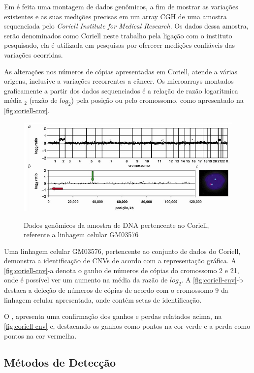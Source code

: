 Em \cite{Snijders2001} é feita uma montagem de dados genômicos, a fim de mostrar as variações existentes e as suas medições precisas em um array CGH de uma amostra sequenciada pelo \textit{Coriell Institute for Medical Research}. Os dados dessa amostra, serão denominados como Coriell neste trabalho pela ligação com o instituto pesquisado, ela é utilizada em pesquisas por oferecer medições confiáveis das variações ocorridas. 

As alterações nos números de cópias apresentadas em Coriell, atende a várias origens, inclusive a variações recorrentes a câncer. Os microarrays montados graficamente a partir dos dados sequenciados é a relação de razão logarítmica média $_2$ (razão de $log_{2}$) pela posição ou pelo cromossomo, como apresentado na \autoref{fig:coriell-cnv}.

\begin{figure}[!htb]
    \centering
    \caption{Dados genômicos da amostra de DNA pertencente ao Coriell, referente a linhagem celular GM03576}
    \includegraphics[width=1\textwidth]{./dados/figuras/coriell-cnv}
    \label{fig:coriell-cnv}
\end{figure}

Uma linhagem celular GM03576, pertencente ao conjunto de dados do Coriell, demonstra a identificação de CNVs de acordo com a representação gráfica. A \autoref{fig:coriell-cnv}-a denota o ganho de números de cópias do cromossomo 2 e 21, onde é possível ver um aumento na média da razão de $log_{2}$. A \autoref{fig:coriell-cnv}-b destaca a deleção de números de cópias de acordo com o cromossomo 9 da linhagem celular apresentada, onde contém setas de identificação. 

O \cite{Snijders2001}, apresenta uma confirmação dos ganhos e perdas relatados acima, na \autoref{fig:coriell-cnv}-c, destacando os ganhos como pontos na cor verde e a perda como pontos na cor vermelha.

\subsection{Métodos de Detecção} 

